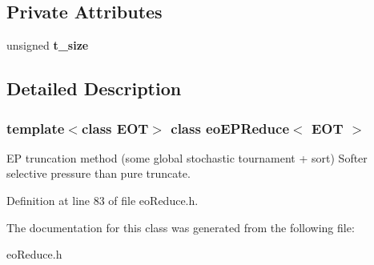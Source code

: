 \subsection*{Private Attributes}
\begin{CompactItemize}
\item 
unsigned {\bf t\_\-size}\label{classeo_e_p_reduce_r0}

\end{CompactItemize}


\subsection{Detailed Description}
\subsubsection*{template$<$class EOT$>$ class eo\-EPReduce$<$ EOT $>$}

EP truncation method (some global stochastic tournament + sort) Softer selective pressure than pure truncate. 



Definition at line 83 of file eo\-Reduce.h.

The documentation for this class was generated from the following file:\begin{CompactItemize}
\item 
eo\-Reduce.h\end{CompactItemize}

